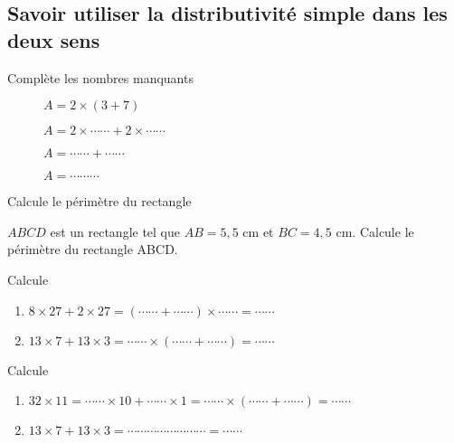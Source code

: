 \subsection{Savoir utiliser la distributivité simple dans les deux sens}



Complète les nombres manquants

\begin{description}
\item[] $A=2\times(3+7)$
\item[] $A=2\times\cdots\cdots + 2\times\cdots\cdots $
\item[] $A=\cdots\cdots + \cdots\cdots$
\item[] $A=\cdots\cdots\cdots$
\end{description}





Calcule le périmètre du rectangle




$ABCD$ est un rectangle tel que $AB=5,5$ cm et $BC =4,5$ cm.  Calcule le périmètre du rectangle ABCD.





Calcule
\begin{enumerate}
\item $8 \times 27 + 2 \times 27 = (\cdots \cdots+ \cdots\cdots)\times \cdots\cdots = \cdots \cdots$
\item $13 \times 7 + 13 \times 3 = \cdots \cdots \times (\cdots \cdots + \cdots\cdots) = \cdots \cdots$ 
\end{enumerate}



Calcule
\begin{enumerate}
\item $32 \times 11 = \cdots \cdots \times 10 + \cdots\cdots \times 1 = \cdots \cdots \times (\cdots \cdots + \cdots\cdots) = \cdots \cdots$
\item $13 \times 7 + 13 \times 3 = \cdots \cdots\cdots \cdots\cdots \cdots\cdots \cdots = \cdots \cdots$ 
\end{enumerate}



